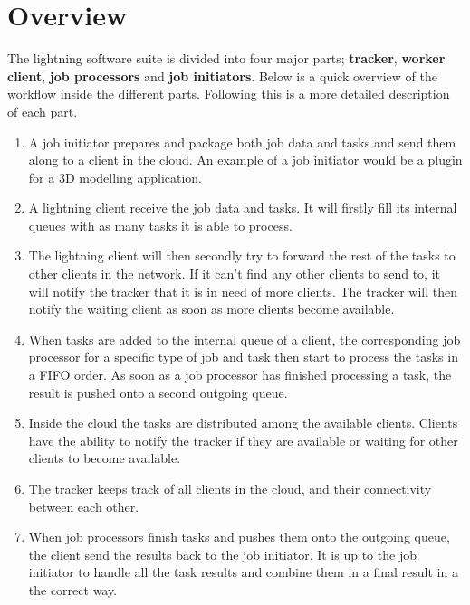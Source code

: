 \chapter{Overview}
The lightning software suite is divided into four major parts; \textbf{tracker}, \textbf{worker client}, \textbf{job processors} and \textbf{job initiators}. Below is a quick overview of the workflow inside the different parts. Following this is a more detailed description of each part.

\begin{enumerate}
  \item A job initiator prepares and package both job data and tasks and send them along to a client in the cloud. An example of a job initiator would be a plugin for a 3D modelling application.
  \item A lightning client receive the job data and tasks. It will firstly fill its internal queues with as many tasks it is able to process.
  \item The lightning client will then secondly try to forward the rest of the tasks to other clients in the network. If it can't find any other clients to send to, it will notify the tracker that it is in need of more clients. The tracker will then notify the waiting client as soon as more clients become available.
  \item When tasks are added to the internal queue of a client, the corresponding job processor for a specific type of job and task then start to process the tasks in a FIFO order. As soon as a job processor has finished processing a task, the result is pushed onto a second outgoing queue.
  \item Inside the cloud the tasks are distributed among the available clients. Clients have the ability to notify the tracker if they are available or waiting for other clients to become available.
  \item The tracker keeps track of all clients in the cloud, and their connectivity between each other.
  \item When job processors finish tasks and pushes them onto the outgoing queue, the client send the results back to the job initiator. It is up to the job initiator to handle all the task results and combine them in a final result in a the correct way.
\end{enumerate}

